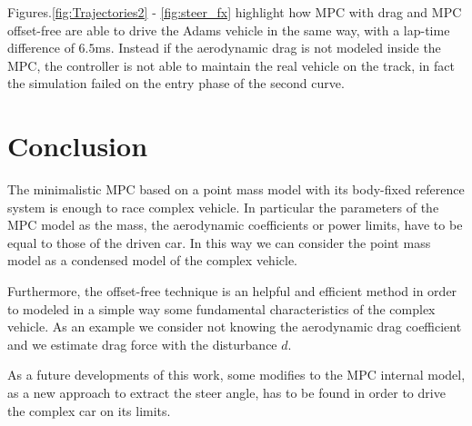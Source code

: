 \documentclass[conference]{IEEEtran} %
\begin{document}
Figures.\ref{fig:Trajectories2} - \ref{fig:steer_fx} highlight how MPC with drag and MPC offset-free are able to drive the Adams vehicle in the same way, with a lap-time difference of $6.5$ms. Instead if the aerodynamic drag is not modeled inside the MPC, the controller is not able to maintain the real vehicle on the track, in fact the simulation failed on the entry phase of the second curve.



\section{Conclusion}
The minimalistic MPC based on a point mass model with its body-fixed reference system is enough to race complex vehicle. In particular the parameters of the MPC model as the mass, the aerodynamic coefficients or power limits, have to be equal to those of the driven car. In this way we can consider the point mass model as a condensed model of the complex vehicle.

Furthermore, the offset-free technique is an helpful and efficient method in order to modeled in a simple way some fundamental characteristics of the complex vehicle. As an example we consider not knowing the aerodynamic drag coefficient and we estimate drag force with the disturbance $d$.

As a future developments of this work, some modifies to the MPC internal model, as a new approach to extract the steer angle, has to be found in order to drive the complex car on its limits. 
\label{sec:conclusion}





\end{document}
